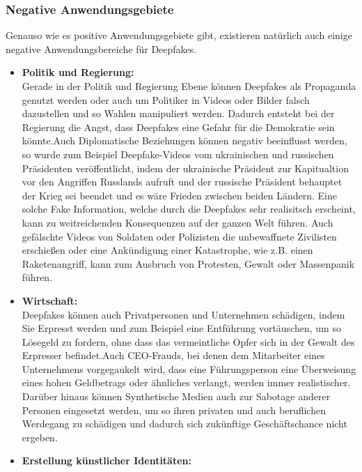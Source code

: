 \subsubsection*{Negative Anwendungsgebiete}
Genauso wie es positive Anwendungsgebiete gibt, existieren natürlich auch einige negative Anwendungsbereiche für Deepfakes.
\begin{itemize}
    \item \textbf{Politik und Regierung:} \\
    Gerade in der Politik und Regierung Ebene können Deepfakes als Propaganda genutzt werden oder auch um Politiker in Videos oder Bilder falsch dazustellen und so Wahlen manipuliert werden. Dadurch entsteht bei der Regierung die Angst, dass Deepfakes eine Gefahr für die Demokratie sein könnte.\cite{ResearchGate}\newline Auch Diplomatische Beziehungen können negativ beeinflusst werden, so wurde zum Beispiel Deepfake-Videos vom ukrainischen und russischen Präsidenten veröffentlicht, indem der ukrainische Präsident zur Kapitualtion vor den Angriffen Russlands aufruft und der russische Präsident behauptet der Krieg sei beendet und es wäre Frieden zwischen beiden Ländern. Eine solche Fake Information, welche durch die Deepfakes sehr realisitsch erscheint, kann zu weitreichenden Konsequenzen auf der ganzen Welt führen. Auch gefälschte Videos von Soldaten oder Polizisten die unbewaffnete Zivilisten erschießen oder eine Ankündigung einer Katastrophe, wie z.B. einen Raketenangriff, kann zum Ausbruch von Protesten, Gewalt oder Massenpanik führen.\cite{SpringerLink}
    \item \textbf{Wirtschaft:} \\
    Deepfakes können auch Privatpersonen und Unternehmen schädigen, indem Sie Erpresst werden und zum Beispiel eine Entführung vortäuschen, um so Lösegeld zu fordern, ohne dass das vermeintliche Opfer sich in der Gewalt des Erpresser befindet.\newline Auch CEO-Frauds, bei denen dem Mitarbeiter eines Unternehmens vorgegaukelt wird, dass eine Führungsperson eine Überweisung eines hohen Geldbetrags oder ähnliches verlangt, werden immer realistischer. Darüber hinaus können Synthetische Medien auch zur Sabotage anderer Personen eingesetzt werden, um so ihren privaten und auch beruflichen Werdegang zu schädigen und dadurch sich zukünftige Geschäftschance nicht ergeben.\cite{SpringerLink}
    \item \textbf{Erstellung künstlicher Identitäten:} \\

\end{itemize}
